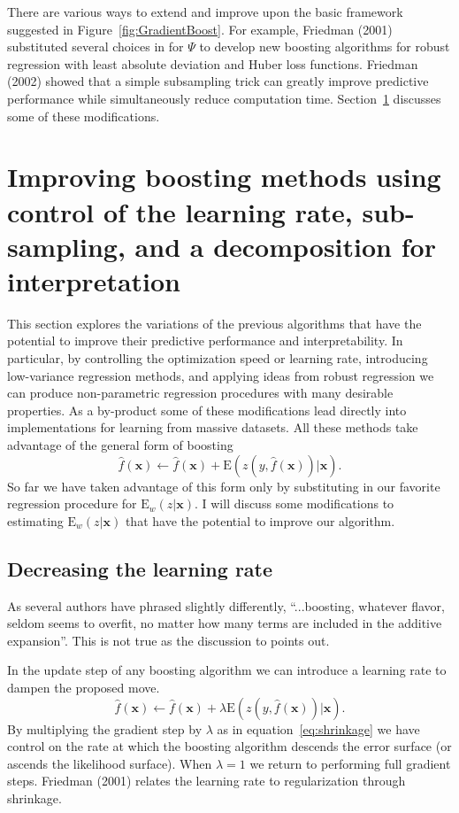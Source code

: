 \documentclass{article}
\newcommand{\EV}{\mathrm{E}}
\begin{document}
There are various ways to extend and improve upon the basic framework suggested in Figure~\ref{fig:GradientBoost}. For example, Friedman (2001) substituted several choices in for $\Psi$ to develop new boosting algorithms for robust regression with least absolute deviation and Huber loss functions. Friedman (2002) showed that a simple subsampling trick can greatly improve predictive performance while simultaneously reduce computation time. Section~\ref{GBMModifications} discusses some of these modifications.

\section{Improving boosting methods using control of the learning rate, sub-sampling, and a decomposition for interpretation} \label{GBMModifications}

This section explores the variations of the previous algorithms that have the potential to improve their predictive performance and interpretability. In particular, by controlling the optimization speed or learning rate, introducing low-variance regression methods, and applying ideas from robust regression we can produce non-parametric regression procedures with many desirable properties. As a by-product some of these modifications lead directly into implementations for learning from massive datasets. All these methods take advantage of the general form of boosting 
\begin{equation} 
\hat f(\mathbf{x}) \leftarrow \hat f(\mathbf{x}) + \EV(z(y,\hat f(\mathbf{x}))|\mathbf{x}). 
\end{equation} So far we have taken advantage of this form only by substituting in our favorite regression procedure for $\EV_w(z|\mathbf{x})$. I will discuss some modifications to estimating $\EV_w(z|\mathbf{x})$ that have the potential to improve our algorithm.

\subsection{Decreasing the learning rate} As several authors have phrased slightly differently, ``...boosting, whatever flavor, seldom seems to overfit, no matter how many terms are included in the additive expansion''. This is not true as the discussion to \cite{FHT:2000} points out.

In the update step of any boosting algorithm we can introduce a learning rate to dampen the proposed move. 
\begin{equation} 
\label{eq:shrinkage} 
\hat f(\mathbf{x}) \leftarrow \hat f(\mathbf{x}) + \lambda \EV(z(y,\hat f(\mathbf{x}))|\mathbf{x}). 
\end{equation} 
By multiplying the gradient step by $\lambda$ as in equation~\ref{eq:shrinkage} we have control on the rate at which the boosting algorithm descends the error surface (or ascends the likelihood surface). When $\lambda=1$ we return to performing full gradient steps. Friedman (2001) relates the learning rate to regularization through shrinkage.
\end{document}
